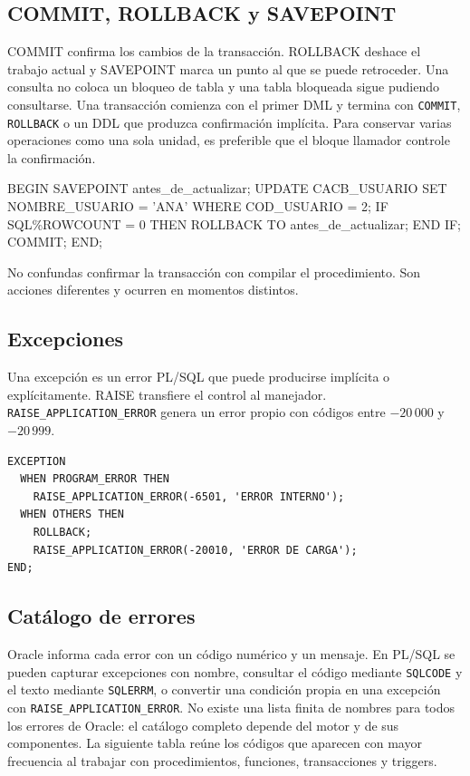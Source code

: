 \documentclass[10pt,letterpaper]{article}
\begin{document}
\subsection{COMMIT, ROLLBACK y SAVEPOINT}
COMMIT confirma los cambios de la transacción. ROLLBACK deshace el trabajo
actual y SAVEPOINT marca un punto al que se puede retroceder. Una consulta no
coloca un bloqueo de tabla y una tabla bloqueada sigue pudiendo consultarse.
Una transacción comienza con el primer DML y termina con \texttt{COMMIT},
\texttt{ROLLBACK} o un DDL que produzca confirmación implícita. Para conservar
varias operaciones como una sola unidad, es preferible que el bloque llamador
controle la confirmación.
\begin{sqlexample}
BEGIN
  SAVEPOINT antes_de_actualizar;
  UPDATE CACB_USUARIO SET NOMBRE_USUARIO = 'ANA'
   WHERE COD_USUARIO = 2;
  IF SQL\%ROWCOUNT = 0 THEN
    ROLLBACK TO antes_de_actualizar;
  END IF;
  COMMIT;
END;
\end{sqlexample}
\begin{errorcritico}
No confundas confirmar la transacción con compilar el procedimiento. Son
acciones diferentes y ocurren en momentos distintos.
\end{errorcritico}
\subsection{Excepciones}
Una excepción es un error PL/SQL que puede producirse implícita o explícitamente.
RAISE transfiere el control al manejador. \texttt{RAISE\_APPLICATION\_ERROR} genera un
error propio con códigos entre $-20\,000$ y $-20\,999$.
\begin{lstlisting}
EXCEPTION
  WHEN PROGRAM_ERROR THEN
    RAISE_APPLICATION_ERROR(-6501, 'ERROR INTERNO');
  WHEN OTHERS THEN
    ROLLBACK;
    RAISE_APPLICATION_ERROR(-20010, 'ERROR DE CARGA');
END;
\end{lstlisting}

\subsection{Catálogo de errores}
Oracle informa cada error con un código numérico y un mensaje. En PL/SQL se
pueden capturar excepciones con nombre, consultar el código mediante
\texttt{SQLCODE} y el texto mediante \texttt{SQLERRM}, o convertir una condición
propia en una excepción con \texttt{RAISE\_APPLICATION\_ERROR}. No existe una
lista finita de nombres para todos los errores de Oracle: el catálogo completo
depende del motor y de sus componentes. La siguiente tabla reúne los códigos
que aparecen con mayor frecuencia al trabajar con procedimientos, funciones,
transacciones y triggers.
\end{document}
